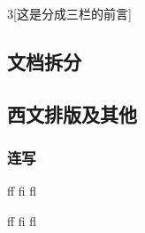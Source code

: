 \documentclass{ctexart}
\begin{document}
{%
    \begin{multicols}{3}[\centering 这是分成三栏的前言] 
            \blindtext
            \the\columnwidth

            \columnbreak

            \blindtext
            \the\columnwidth

            \newpage

            \blindtext
            \the\columnwidth
    \end{multicols}

    \blindtext

    \clearpage 
        } 

    \subsection{文档拆分}

    \subsection{西文排版及其他}
        \subsubsection{连写}
            ff fi fl %

            f\mbox{}f f\mbox{}i f\mbox{}l %
\end{document}
